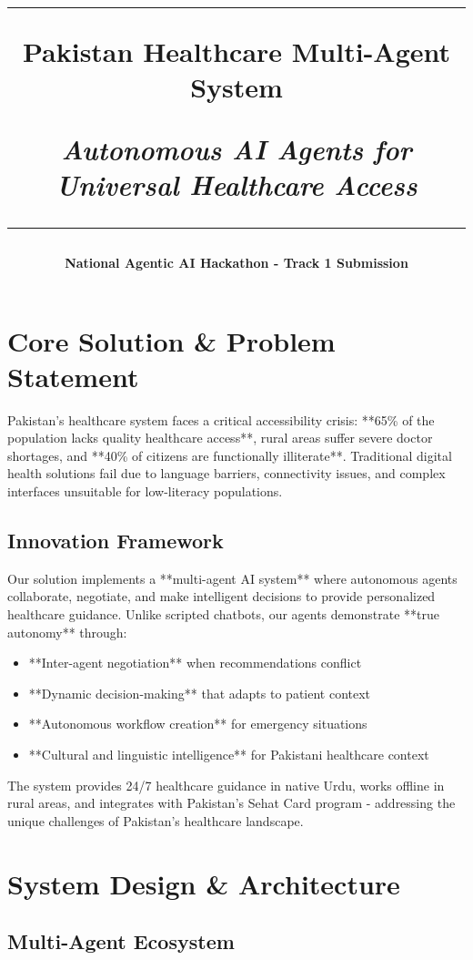\documentclass[11pt,a4paper]{article}
\title{
    \vspace{-1cm}
    \textcolor{primaryblue}{\rule{\textwidth}{2pt}}
    \vspace{0.3cm}
    
    {\Huge\textbf{Pakistan Healthcare Multi-Agent System}}
    
    \vspace{0.2cm}
    {\Large\textit{Autonomous AI Agents for Universal Healthcare Access}}
    
    \vspace{0.3cm}
    \textcolor{primaryblue}{\rule{\textwidth}{2pt}}
}
\author{\textbf{National Agentic AI Hackathon - Track 1 Submission}}
\date{}
\begin{document}
\maketitle
\vspace{-1cm}

\section{Core Solution \& Problem Statement}

Pakistan's healthcare system faces a critical accessibility crisis: **65\% of the population lacks quality healthcare access**, rural areas suffer severe doctor shortages, and **40\% of citizens are functionally illiterate**. Traditional digital health solutions fail due to language barriers, connectivity issues, and complex interfaces unsuitable for low-literacy populations.

\subsection{Innovation Framework}

Our solution implements a **multi-agent AI system** where autonomous agents collaborate, negotiate, and make intelligent decisions to provide personalized healthcare guidance. Unlike scripted chatbots, our agents demonstrate **true autonomy** through:

\begin{itemize}[leftmargin=*, itemsep=0pt]
    \item **Inter-agent negotiation** when recommendations conflict
    \item **Dynamic decision-making** that adapts to patient context
    \item **Autonomous workflow creation** for emergency situations
    \item **Cultural and linguistic intelligence** for Pakistani healthcare context
\end{itemize}

The system provides 24/7 healthcare guidance in native Urdu, works offline in rural areas, and integrates with Pakistan's Sehat Card program - addressing the unique challenges of Pakistan's healthcare landscape.

\section{System Design \& Architecture}

\subsection{Multi-Agent Ecosystem}
\end{document}
